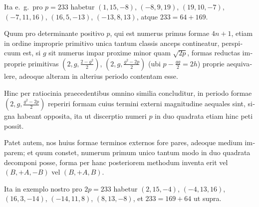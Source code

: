 \documentclass[12pt,a4paper]{article}
\theoremstyle{plain}
\theoremstyle{definition}
\theoremstyle{remark}
\begin{document}
\begin{otherlanguage}{latin}
Ita e.\ g.\ pro $p = 233$ habetur $(1, 15, -8)$, $(-8, 9, 19)$, $(19, 10, -7)$, $(-7, 11, 16)$, $(16, 5, -13)$, $(-13, 8, 13)$, atque $233 = 64 + 169$.

Quum pro determinante positivo $p$, qui est numerus primus formae $4n+1$, etiam in ordine improprie primitivo unica tantum classis anceps contineatur, perspicuum est, si $g$ sit numerus impar proxime minor quam $\sqrt{2p}$, formas reductas improprie primitivas $(2, g, \frac{2-g^2}{2})$, $(2, g, \frac{g^2-2p}{2})$ (ubi $p - \frac{gg}{2} = 2h$) proprie aequivalere, adeoque alteram in alterius periodo contentam esse.

Hinc per ratiocinia praecedentibus omnino similia concluditur, in periodo formae $(2, g, \frac{g^2-2p}{2})$ reperiri formam cuius termini externi magnitudine aequales sint, signa habeant opposita, ita ut discerptio numeri $p$ in duo quadrata etiam hinc peti possit.

Patet autem, nos huius formae terminos externos fore pares, adeoque medium imparem; et quum constet, numerum primum unico tantum modo in duo quadrata decomponi posse, forma per hanc posteriorem methodum inventa erit vel $(B, +A, -B)$ vel $(B, +A, B)$.

Ita in exemplo nostro pro $2p = 233$ habetur $(2, 15, -4)$, $(-4, 13, 16)$, $(16, 3, -14)$, $(-14, 11, 8)$, $(8, 13, -8)$, et $233 = 169 + 64$ ut supra.

\end{otherlanguage}
\end{document}
